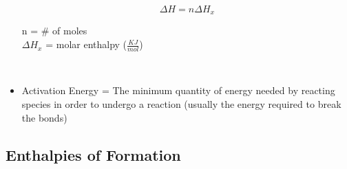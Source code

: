 \documentclass[11pt]{article}
\begin{document}
\begin{itemize}
    \begin{equation}
        \Delta H = n\Delta H_x
    \end{equation}
    \begin{center}
        n = # of moles\\
        $\Delta H_x$ = molar enthalpy ($\frac{KJ}{mol}$)
    \end{center}
    \\

    \item Activation Energy = The minimum quantity of energy needed by reacting species in order to undergo a reaction (usually the energy required to break the bonds)
\end{itemize}
\pagebreak
\subsection{Enthalpies of Formation}
\end{document}
